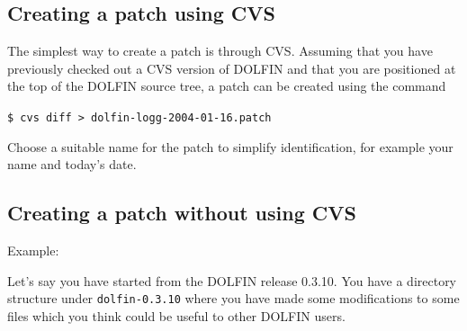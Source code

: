 \documentclass[12pt]{article}
\begin{document}
\subsection{Creating a patch using CVS}

The simplest way to create a patch is through CVS. Assuming that you
have previously checked out a CVS version of DOLFIN and that you are positioned at
the top of the DOLFIN source tree, a patch can be created using the command

\texttt{\$ cvs diff > dolfin-logg-2004-01-16.patch}

Choose a suitable name for the patch to simplify identification, for example your name and
today's date.

\subsection{Creating a patch without using CVS}

Example:

Let's say you have started from the DOLFIN release 0.3.10. You have a
directory structure under \texttt{dolfin-0.3.10} where you have made
some modifications to some files which you think could be useful to
other DOLFIN users.
\end{document}

